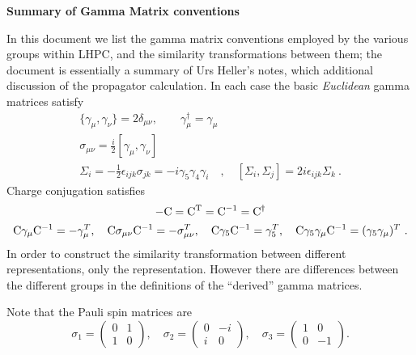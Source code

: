 \documentclass[12pt]{article}
\begin{document}
\begin{center}
{\bfseries\Large Summary of Gamma Matrix conventions}\\[1.0ex]
\end{center}
\setcounter{section}{1} In this document we list the gamma matrix
conventions employed by the various groups within LHPC, and the
similarity transformations between them; the document is essentially a
summary of Urs Heller's notes, which additional discussion of the
propagator calculation.  In each case the basic \textit{Euclidean}
gamma matrices satisfy
\begin{gather*}
\{ \gamma_{\mu}, \gamma_{\nu} \} = 2 \delta_{\mu\nu}, \qquad 
\gamma_\mu^{\dagger} = \gamma_\mu \\
\sigma_{\mu\nu} = \frac{i}{2}[\gamma_\mu,\gamma_\nu] \\
\Sigma_i = -\frac{1}{2}\epsilon_{ijk}\sigma_{jk} = -i\gamma_5\gamma_4\gamma_i\quad , \quad
[\Sigma_i,\Sigma_j] = 2 i \epsilon_{ijk}\Sigma_k \ .
\end{gather*}
Charge conjugation satisfies
\begin{gather*}
-{\rm C} = {\rm C}^{\rm T} = {\rm C}^{-1} = {\rm C}^\dagger \\
{\rm C} \gamma_\mu {\rm C}^{-1} = -\gamma_\mu^{T}, \quad
{\rm C} \sigma_{\mu\nu} {\rm C}^{-1} = -\sigma_{\mu\nu}^{T}, \quad
{\rm C} \gamma_5 {\rm C}^{-1} = \gamma_5^{T}, \quad
{\rm C} \gamma_5\gamma_\mu {\rm C}^{-1} = (\gamma_5\gamma_\mu)^{T}\ .
\end{gather*}
In order to construct the similarity transformation between different
representations, only the representation.
However there are differences between the different groups in the
definitions of the ``derived'' gamma matrices.

Note that the Pauli spin matrices are
\begin{displaymath}
\sigma_1 = \begin{pmatrix} 0 & 1\\ 1 & 0 \end{pmatrix}, \quad
\sigma_2 = \begin{pmatrix} 0 & -i\\ i & 0 \end{pmatrix}, \quad
\sigma_3 = \begin{pmatrix} 1 & 0\\ 0 & -1 \end{pmatrix}.
\end{displaymath}
\end{document}
